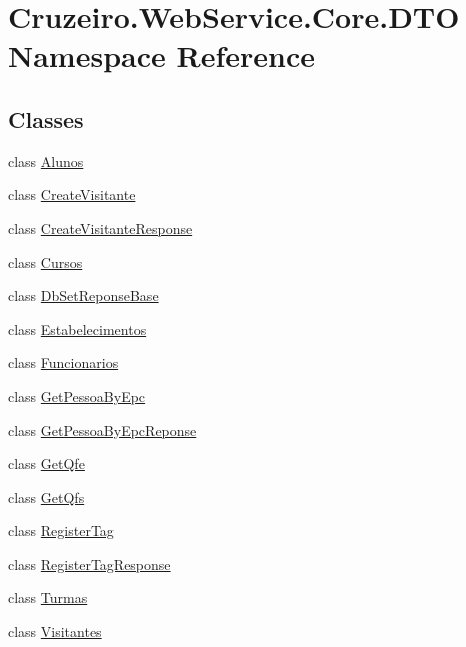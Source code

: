 \hypertarget{namespace_cruzeiro_1_1_web_service_1_1_core_1_1_d_t_o}{}\section{Cruzeiro.\+Web\+Service.\+Core.\+D\+TO Namespace Reference}
\label{namespace_cruzeiro_1_1_web_service_1_1_core_1_1_d_t_o}
\subsection*{Classes}
\begin{DoxyCompactItemize}
\item 
class \hyperlink{class_cruzeiro_1_1_web_service_1_1_core_1_1_d_t_o_1_1_alunos}{Alunos}
\item 
class \hyperlink{class_cruzeiro_1_1_web_service_1_1_core_1_1_d_t_o_1_1_create_visitante}{Create\+Visitante}
\item 
class \hyperlink{class_cruzeiro_1_1_web_service_1_1_core_1_1_d_t_o_1_1_create_visitante_response}{Create\+Visitante\+Response}
\item 
class \hyperlink{class_cruzeiro_1_1_web_service_1_1_core_1_1_d_t_o_1_1_cursos}{Cursos}
\item 
class \hyperlink{class_cruzeiro_1_1_web_service_1_1_core_1_1_d_t_o_1_1_db_set_reponse_base}{Db\+Set\+Reponse\+Base}
\item 
class \hyperlink{class_cruzeiro_1_1_web_service_1_1_core_1_1_d_t_o_1_1_estabelecimentos}{Estabelecimentos}
\item 
class \hyperlink{class_cruzeiro_1_1_web_service_1_1_core_1_1_d_t_o_1_1_funcionarios}{Funcionarios}
\item 
class \hyperlink{class_cruzeiro_1_1_web_service_1_1_core_1_1_d_t_o_1_1_get_pessoa_by_epc}{Get\+Pessoa\+By\+Epc}
\item 
class \hyperlink{class_cruzeiro_1_1_web_service_1_1_core_1_1_d_t_o_1_1_get_pessoa_by_epc_reponse}{Get\+Pessoa\+By\+Epc\+Reponse}
\item 
class \hyperlink{class_cruzeiro_1_1_web_service_1_1_core_1_1_d_t_o_1_1_get_qfe}{Get\+Qfe}
\item 
class \hyperlink{class_cruzeiro_1_1_web_service_1_1_core_1_1_d_t_o_1_1_get_qfs}{Get\+Qfs}
\item 
class \hyperlink{class_cruzeiro_1_1_web_service_1_1_core_1_1_d_t_o_1_1_register_tag}{Register\+Tag}
\item 
class \hyperlink{class_cruzeiro_1_1_web_service_1_1_core_1_1_d_t_o_1_1_register_tag_response}{Register\+Tag\+Response}
\item 
class \hyperlink{class_cruzeiro_1_1_web_service_1_1_core_1_1_d_t_o_1_1_turmas}{Turmas}
\item 
class \hyperlink{class_cruzeiro_1_1_web_service_1_1_core_1_1_d_t_o_1_1_visitantes}{Visitantes}
\end{DoxyCompactItemize}
